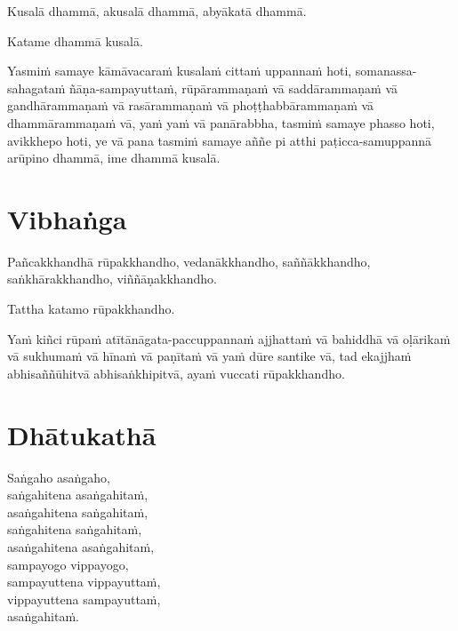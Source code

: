 \enlargethispage{\baselineskip}

Kusalā dhammā, akusalā dhammā, abyākatā dhammā.

Katame dhammā kusalā.

Yasmiṁ samaye kāmāvacaraṁ kusalaṁ cittaṁ uppannaṁ hoti, somanassa-sahagataṁ
ñāṇa-sampayuttaṁ, rūpārammaṇaṁ vā saddārammaṇaṁ vā gandhārammaṇaṁ vā
rasārammaṇaṁ vā phoṭṭhabbārammaṇaṁ vā dhammārammaṇaṁ vā, yaṁ yaṁ vā panārabbha,
tasmiṁ samaye phasso hoti, avikkhepo hoti, ye vā pana tasmiṁ samaye aññe pi atthi paṭicca-samuppannā arūpino dhammā, ime dhammā kusalā.




\section{Vibhaṅga}

Pañcakkhandhā rūpakkhandho, vedanākkhandho, saññākkhandho, saṅkhārakkhandho,
viññāṇakkhandho.

Tattha katamo rūpakkhandho.

Yaṁ kiñci rūpaṁ atītānāgata-paccuppannaṁ ajjhattaṁ vā bahiddhā vā oḷārikaṁ vā
sukhumaṁ vā hīnaṁ vā paṇītaṁ vā yaṁ dūre santike vā, tad ekajjhaṁ
abhisaññūhitvā abhisaṅkhipitvā, ayaṁ vuccati rūpakkhandho.



\section{Dhātukathā}

Saṅgaho asaṅgaho,\\
saṅgahitena asaṅgahitaṁ,\\
asaṅgahitena saṅgahitaṁ,\\
saṅgahitena saṅgahitaṁ,\\
asaṅgahitena asaṅgahitaṁ,\\
sampayogo vippayogo,\\
sampayuttena vippayuttaṁ,\\
vippayuttena sampayuttaṁ,\\
asaṅgahitaṁ.

